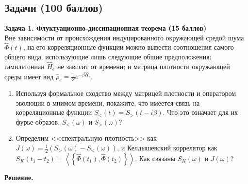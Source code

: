 \documentclass[12pt]{article}
\theoremstyle{definition}
\begin{document}
\subsection*{Задачи (100 баллов)}
\textbf{Задача 1. Флуктуационно-диссипационная теорема (15 баллов)}\\
Вне зависимости от происхождения индуцированного окружающей средой шума $\hat{\Phi}(t)$, на его корреляционные функции можно вывести соотношения самого общего вида, использующие лишь следующие общие предположения: гамильтониан $\hat{H}_e$ не зависит от времени; и матрица плотности окружающей среды имеет вид $\hat{\rho}_e =\frac{1}{Z}e^{-\beta\hat{H}_e}$.
\begin{enumerate}
    \item Используя формальное сходство между матрицей плотности и оператором эволюции в мнимом времени, покажите, что имеется связь на корреляционные функции $S_<(t) = S_>(t-i\beta)$. Что это означает для их фурье-образов, $S_<(\omega)$ и $S_>(\omega)$?
    \item Определим <<спектральную плотность>> как $J(\omega) = \frac{1}{2}(S_>(\omega)-S_<(\omega))$, и Келдышевский коррелятор как $S_K(t_1-t_2) = \left<\left\{\hat{\Phi}(t_1), \hat{\Phi}(t_2)\right\}\right>$. Как связаны $S_K(\omega)$ и $J(\omega)$?
\end{enumerate}
\textbf{Решение.}
\end{document}
